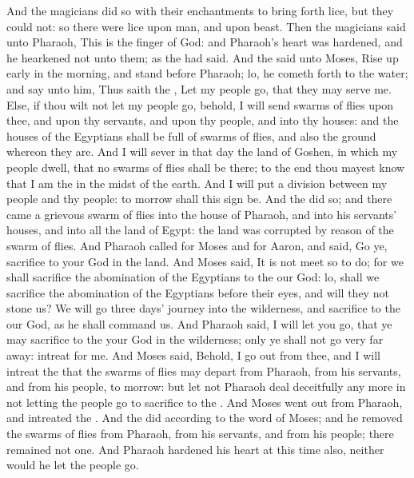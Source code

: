 \begin{biblechapter}
\verse And the magicians did so with their enchantments to bring forth lice, but they could not: so there were lice upon man, and upon beast.
\verse Then the magicians said unto Pharaoh, This is the finger of God: and Pharaoh's heart was hardened, and he hearkened not unto them; as the \LORD had said.
 And the \LORD said unto Moses, Rise up early in the morning, and stand before Pharaoh; lo, he cometh forth to the water; and say unto him, Thus saith the \LORD, Let my people go, that they may serve me.
\verse Else, if thou wilt not let my people go, behold, I will send swarms of flies upon thee, and upon thy servants, and upon thy people, and into thy houses: and the houses of the Egyptians shall be full of swarms of flies, and also the ground whereon they are.
\verse And I will sever in that day the land of Goshen, in which my people dwell, that no swarms of flies shall be there; to the end thou mayest know that I am the \LORD in the midst of the earth.
\verse And I will put a division between my people and thy people: to morrow shall this sign be.
\verse And the \LORD did so; and there came a grievous swarm of flies into the house of Pharaoh, and into his servants' houses, and into all the land of Egypt: the land was corrupted by reason of the swarm of flies.
\verse And Pharaoh called for Moses and for Aaron, and said, Go ye, sacrifice to your God in the land.
\verse And Moses said, It is not meet so to do; for we shall sacrifice the abomination of the Egyptians to the \LORD our God: lo, shall we sacrifice the abomination of the Egyptians before their eyes, and will they not stone us?
\verse We will go three days' journey into the wilderness, and sacrifice to the \LORD our God, as he shall command us.
\verse And Pharaoh said, I will let you go, that ye may sacrifice to the \LORD your God in the wilderness; only ye shall not go very far away: intreat for me.
\verse And Moses said, Behold, I go out from thee, and I will intreat the \LORD that the swarms of flies may depart from Pharaoh, from his servants, and from his people, to morrow: but let not Pharaoh deal deceitfully any more in not letting the people go to sacrifice to the \LORD.
\verse And Moses went out from Pharaoh, and intreated the \LORD.
\verse And the \LORD did according to the word of Moses; and he removed the swarms of flies from Pharaoh, from his servants, and from his people; there remained not one.
\verse And Pharaoh hardened his heart at this time also, neither would he let the people go.
\end{biblechapter}

